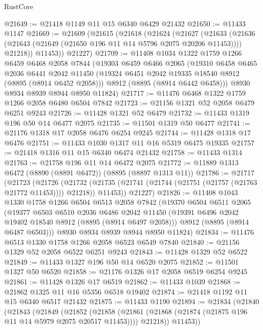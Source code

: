 \begin{lexlean}{RustCore}
\begin{coremodule}
@21649 := @21418 @1149 @11 @15 @6340 @6429 @21432
@21650 := @11433 @1147
@21669 := @21609
    (@21615
      (@21618
        (@21624
          (@21627
            (@21633
              (@21636 (@21643 (@21649 (@21650 @196 @11 @14 @5796 @2075 @20206 @11453))))
              @21218))
          @11453))
      @21227)
@21709 := @11408
    @1034
    @1322
    @1759
    @1266
    @6459
    @6468
    @2058
    @7844
    (@19303
      @6459
      @6466
      @2065
      (@19310
        @6458
        @6465
        @2036
        @6441
        @2042
        @11450
        (@19324 @6451 @2042 @19335 @18540 @8912 (@8895 (@8914 @6452 @2058)))
        @8912
        (@8895 (@8914 @6442 @6458)))
      @8930
      @8934
      @8939
      @8944
      @8950
      @11824)
@21717 := @11476 @6468 @1322 @1759 @1266 @2058 @6480 @6504 @7842
@21723 := @21156 @1321 @52 @2058 @6479 @6251 @9243
@21726 := @11428 @1321 @52 @6479
@21732 := @11433 @1319 @196 @50 @14 @6477 @2075
@21735 := @11501 @1319 @50 @6477
@21741 := @21176 @1318 @17 @2058 @6476 @6254 @9245
@21744 := @11428 @1318 @17 @6476
@21751 := @11433 @1030 @1317 @11 @16 @5319 @6475 @19335
@21757 := @21418 @1316 @11 @15 @6340 @6474 @21432
@21758 := @11433 @1314
@21763 := @21758 @196 @11 @14 @6472 @2075
@21772 := @11889 @1313 @6472 (@8890 (@8891 @6472)) (@8895 (@8897 @1313 @11))
@21786 := @21717
    (@21723
      (@21726
        (@21732 (@21735 (@21741 (@21744 (@21751 (@21757 (@21763 @21772 @11453)))) @21218)) @11453))
      @21227)
@21826 := @11408
    @1043
    @1330
    @1758
    @1266
    @6504
    @6513
    @2058
    @7842
    (@19370
      @6504
      @6511
      @2065
      (@19377
        @6503
        @6510
        @2036
        @6486
        @2042
        @11450
        (@19391 @6496 @2042 @19402 @18540 @8912 (@8895 (@8914 @6497 @2058)))
        @8912
        (@8895 (@8914 @6487 @6503)))
      @8930
      @8934
      @8939
      @8944
      @8950
      @11824)
@21834 := @11476 @6513 @1330 @1758 @1266 @2058 @6523 @6549 @7840
@21840 := @21156 @1329 @52 @2058 @6522 @6251 @9243
@21843 := @11428 @1329 @52 @6522
@21849 := @11433 @1327 @196 @50 @14 @6520 @2075
@21852 := @11501 @1327 @50 @6520
@21858 := @21176 @1326 @17 @2058 @6519 @6254 @9245
@21861 := @11428 @1326 @17 @6519
@21862 := @11433 @1039
@21868 := @21862 @1325 @11 @16 @5356 @6518 @19402
@21874 := @21418 @1192 @11 @15 @6340 @6517 @21432
@21875 := @11433 @1190
@21894 := @21834
    (@21840
      (@21843
        (@21849
          (@21852
            (@21858
              (@21861 (@21868 (@21874 (@21875 @196 @11 @14 @5979 @2075 @20517 @11453))))
              @21218))
          @11453))

\end{coremodule}
\end{lexlean}
